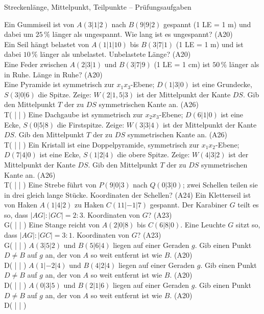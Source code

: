 \begin{aufgabe}{Streckenlänge, Mittelpunkt, Teilpunkte – Prüfungsaufgaben}
\begin{teile}
\teil Ein Gummiseil ist von $A(3 | 1 | 2)$ nach $B(9 | 9 | 2)$ gespannt (1 LE = 1 m) und dabei um $25\,\%$ länger als ungespannt. Wie lang ist es ungespannt? \hfill (A20) \\ \leerfeld[m]
\teil Ein Seil hängt belastet von $A(1 | 1 | 10)$ bis $B(3 | 7 | 1)$ (1 LE = 1 m) und ist dabei $10\,\%$ länger als unbelastet. Unbelastete Länge? \hfill (A20) \\ \leerfeld[m]
\teil Eine Feder zwischen $A(2 | 3 | 1)$ und $B(3 | 7 | 9)$ (1 LE = 1 cm) ist $50\,\%$ länger als in Ruhe. Länge in Ruhe? \hfill (A20) \\ \leerfeld[cm]
\teil Eine Pyramide ist symmetrisch zur $x_1x_3$-Ebene; $D(1 | 3 | 0)$ ist eine Grundecke, $S(3 | 0 | 6)$ die Spitze. Zeige: $W(2 | 1{,}5 | 3)$ ist der Mittelpunkt der Kante $DS$. Gib den Mittelpunkt $T$ der zu $DS$ symmetrischen Kante an. \hfill (A26) \\ T( \leerfeld | \leerfeld | \leerfeld )
\teil Eine Dachgaube ist symmetrisch zur $x_2x_3$-Ebene; $D(6 | 1 | 0)$ ist eine Ecke, $S(0 | 5 | 8)$ die Firstspitze. Zeige: $W(3 | 3 | 4)$ ist der Mittelpunkt der Kante $DS$. Gib den Mittelpunkt $T$ der zu $DS$ symmetrischen Kante an. \hfill (A26) \\ T( \leerfeld | \leerfeld | \leerfeld )
\teil Ein Kristall ist eine Doppelpyramide, symmetrisch zur $x_1x_2$-Ebene; $D(7 | 4 | 0)$ ist eine Ecke, $S(1 | 2 | 4)$ die obere Spitze. Zeige: $W(4 | 3 | 2)$ ist der Mittelpunkt der Kante $DS$. Gib den Mittelpunkt $T$ der zu $DS$ symmetrischen Kante an. \hfill (A26) \\ T( \leerfeld | \leerfeld | \leerfeld )
\teil Eine Strebe führt von $P(9 | 0 | 3)$ nach $Q(0 | 3 | 0)$; zwei Schellen teilen sie in drei gleich lange Stücke. Koordinaten der Schellen? \hfill (A24)
\teil Ein Kletterseil ist von Haken $A(1 | 4 | 2)$ zu Haken $C(11 | -1 | 7)$ gespannt. Der Karabiner $G$ teilt es so, dass $|AG| : |GC| = 2 : 3$. Koordinaten von $G$? \hfill (A23) \\ G( \leerfeld | \leerfeld | \leerfeld )
\teil Eine Stange reicht von $A(2 | 0 | 8)$ bis $C(6 | 8 | 0)$. Eine Leuchte $G$ sitzt so, dass $|AG| : |GC| = 3 : 1$. Koordinaten von $G$? \hfill (A23) \\ G( \leerfeld | \leerfeld | \leerfeld )
\teil $A(3 | 5 | 2)$ und $B(5 | 6 | 4)$ liegen auf einer Geraden $g$. Gib einen Punkt $D \ne B$ auf $g$ an, der von $A$ so weit entfernt ist wie $B$. \hfill (A20) \\ D( \leerfeld | \leerfeld | \leerfeld )
\teil $A(1 | -2 | 4)$ und $B(4 | 2 | 4)$ liegen auf einer Geraden $g$. Gib einen Punkt $D \ne B$ auf $g$ an, der von $A$ so weit entfernt ist wie $B$. \hfill (A20) \\ D( \leerfeld | \leerfeld | \leerfeld )
\teil $A(0 | 3 | 5)$ und $B(2 | 1 | 6)$ liegen auf einer Geraden $g$. Gib einen Punkt $D \ne B$ auf $g$ an, der von $A$ so weit entfernt ist wie $B$. \hfill (A20) \\ D( \leerfeld | \leerfeld | \leerfeld )
\end{teile}
\end{aufgabe}

